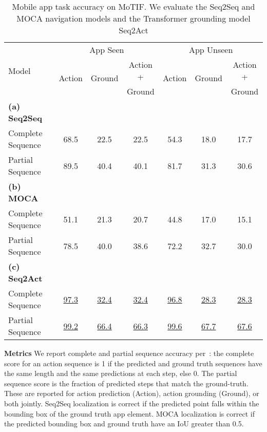 \begin{table}[t]
    \centering
          \renewcommand\arraystretch{0.95}

        \caption{Mobile app task accuracy on MoTIF. We evaluate the Seq2Seq and MOCA navigation models and the Transformer grounding model Seq2Act}
    \begin{tabular}{|l|c|c|c|c|c|c|}
    \hline
    \multirow{3}{*}{Model} & \multicolumn{3}{c|}{App Seen} & \multicolumn{3}{c|}{App Unseen}\\
    \cline{2-7}
   & \multirow{2}{*}{Action} & \multirow{2}{*}{Ground} & Action + &  \multirow{2}{*}{Action} & \multirow{2}{*}{Ground} & Action +\\
   & & & Ground& & & Ground\\
    \hline
    \textbf{(a) Seq2Seq}~\cite{ALFRED20} & & & & & &  \\
    \hspace{5mm} Complete Sequence & 68.5 & 22.5 & 22.5 & 54.3 & 18.0 & 17.7 \\
    \hspace{5mm} Partial Sequence & 89.5 & 40.4 & 40.1 & 81.7 & 31.3 & 30.6 \\
    \hline
    \textbf{(b) MOCA}~\cite{singh2020moca} & & & & & &\\ 
    \hspace{5mm} Complete Sequence & 51.1 & 21.3 & 20.7 & 44.8 & 17.0 & 15.1 \\
    \hspace{5mm} Partial Sequence & 78.5 & 40.0 & 38.6 & 72.2 & 32.7 & 30.0 \\
    \hline
    \textbf{(c) Seq2Act}~\cite{li-etal-2020-mapping} & & & & & &\\
    \hspace{5mm} Complete Sequence & \underline{97.3} & \underline{32.4} & \underline{32.4} & \underline{96.8} & \underline{28.3} & \underline{28.3} \\
   \hspace{5mm} Partial Sequence  & \underline{99.2} & \underline{66.4} & \underline{66.3} & \underline{99.6} & \underline{67.7} & \underline{67.6}  \\
    \hline
    \end{tabular}
    \label{tab:automate_full}
\end{table}
\smallskip

\noindent\textbf{Metrics}
We report complete and partial sequence accuracy per~\cite{li-etal-2020-mapping}: the complete score for an action sequence is 1 if the predicted and ground truth sequences have the same length and the same predictions at each step, else 0. The partial sequence score is the fraction of predicted steps that match the ground-truth. These are reported for action prediction (Action), action grounding (Ground), or both jointly. 
Seq2Seq localization is correct if the predicted point falls within the bounding box of the ground truth app element. MOCA localization is correct if the predicted bounding box and ground truth have an IoU greater than 0.5.
